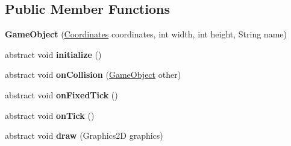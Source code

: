 \subsection*{Public Member Functions}
\begin{DoxyCompactItemize}
\item 
\mbox{\label{classde_1_1me_1_1edgelord_1_1sjgl_1_1gameobject_1_1_game_object_aafac6f204bd6af93e6cc220c1d713575}} 
{\bfseries Game\+Object} (\mbox{\hyperlink{classde_1_1me_1_1edgelord_1_1sjgl_1_1location_1_1_coordinates}{Coordinates}} coordinates, int width, int height, String name)
\item 
\mbox{\label{classde_1_1me_1_1edgelord_1_1sjgl_1_1gameobject_1_1_game_object_adf7f5ff55b2d355bdae314983f396323}} 
abstract void {\bfseries initialize} ()
\item 
\mbox{\label{classde_1_1me_1_1edgelord_1_1sjgl_1_1gameobject_1_1_game_object_a30952cacde1130460af217db3c3152b1}} 
abstract void {\bfseries on\+Collision} (\mbox{\hyperlink{classde_1_1me_1_1edgelord_1_1sjgl_1_1gameobject_1_1_game_object}{Game\+Object}} other)
\item 
\mbox{\label{classde_1_1me_1_1edgelord_1_1sjgl_1_1gameobject_1_1_game_object_a26eb98737c3dbc41b2cf495cb3cda7c6}} 
abstract void {\bfseries on\+Fixed\+Tick} ()
\item 
\mbox{\label{classde_1_1me_1_1edgelord_1_1sjgl_1_1gameobject_1_1_game_object_ac7f506063a1141a43bfeb9f0a2fe2cef}} 
abstract void {\bfseries on\+Tick} ()
\item 
\mbox{\label{classde_1_1me_1_1edgelord_1_1sjgl_1_1gameobject_1_1_game_object_a3a0c768670063cdc8517e1cdce9a492e}} 
abstract void {\bfseries draw} (Graphics2D graphics)
\item 
\mbox{\label{classde_1_1me_1_1edgelord_1_1sjgl_1_1gameobject_1_1_game_object_a255595cb63b17130620f5a1810c274c6}} 

\end{DoxyCompactItemize}
